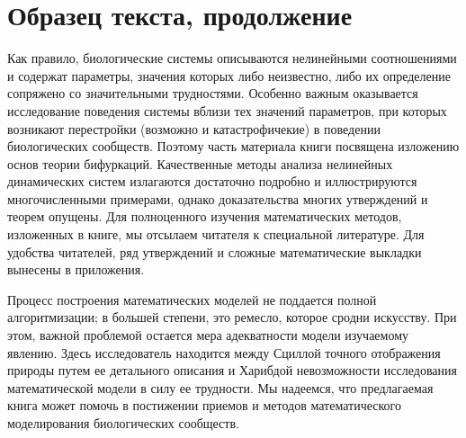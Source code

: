 \documentclass[a4paper,12pt]{article}
\begin{document}
\section{Образец текста, продолжение}
Как правило, биологические системы описываются нелинейными соотношениями и содержат параметры, значения которых либо неизвестно, либо их определение
сопряжено со значительными трудностями. Особенно важным оказывается исследование поведения системы вблизи тех значений параметров, при которых возникают
перестройки (возможно и катастрофичекие) в поведении биологических сообществ.
Поэтому часть материала книги посвящена изложению основ теории бифуркаций.
Качественные методы анализа нелинейных динамических систем излагаются достаточно подробно и иллюстрируются многочисленными примерами, однако доказательства многих утверждений и теорем опущены. Для полноценного изучения математических методов, изложенных в книге, мы отсылаем читателя к специальной
литературе. Для удобства читателей, ряд утверждений и сложные математические
выкладки вынесены в приложения.

Процесс построения математических моделей не поддается полной алгоритмизации; в
большей степени, это ремесло, которое сродни искусству. При этом, важной проблемой остается мера адекватности модели изучаемому явлению. Здесь исследователь находится между Сциллой точного отображения природы путем ее детального
описания и Харибдой невозможности исследования математической модели в силу
ее трудности. Мы надеемся, что предлагаемая книга может помочь в постижении
приемов и методов математического моделирования биологических сообществ.
\end{document}
